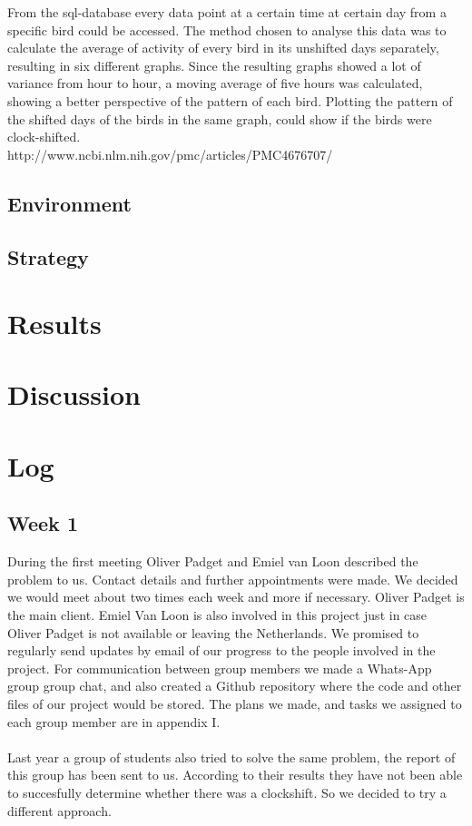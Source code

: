 \documentclass[a4paper]{article}
\begin{document}
From the sql-database every data point at a certain time at certain day from a specific bird could be accessed. The method chosen to analyse this data was to calculate the average of activity of every bird in its unshifted days separately, resulting in six different graphs. Since the resulting graphs showed a lot of variance from hour to hour, a moving average of five hours was calculated, showing a better perspective of the pattern of each bird. Plotting the pattern of the shifted days of the birds in the same graph, could show if the birds were clock-shifted.\\
http://www.ncbi.nlm.nih.gov/pmc/articles/PMC4676707/\\

\subsection*{Environment}

\subsection*{Strategy}
\section*{Results}
\section*{Discussion}
\section*{Log}
\subsection*{Week 1}
During the first meeting Oliver Padget and Emiel van Loon described the problem to us. Contact details and further appointments were made. We decided we would meet about two times each week and more if necessary. Oliver Padget is the main client. Emiel Van Loon is also involved in this project just in case Oliver Padget is not available or leaving the Netherlands.  We promised to regularly send updates by email of our progress to the people involved in the project. For communication between group members we made a Whats-App group group chat, and also created a Github repository where the code and other files of our project would be stored. The plans we made, and tasks we assigned to each group member are in appendix I.\\\\
Last year a group of students also tried to solve the same problem, the report of this group has been sent to us. According to their results they have not been able to succesfully determine whether there was a clockshift. So we decided to try a different approach.
\\\\
\end{document}
